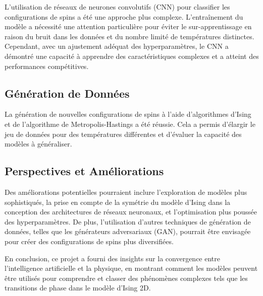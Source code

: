 \documentclass[11pt, parskip=half]{scrartcl} %
\begin{document}
L'utilisation de réseaux de neurones convolutifs (CNN) pour classifier les configurations de spins a été une approche plus complexe. L'entraînement du modèle a nécessité une attention particulière pour éviter le sur-apprentissage en raison du bruit dans les données et du nombre limité de températures distinctes. Cependant, avec un ajustement adéquat des hyperparamètres, le CNN a démontré une capacité à apprendre des caractéristiques complexes et a atteint des performances compétitives.

\subsection*{Génération de Données}

La génération de nouvelles configurations de spins à l'aide d'algorithmes d'Ising et de l'algorithme de Metropolis-Hastings a été réussie. Cela a permis d'élargir le jeu de données pour des températures différentes et d'évaluer la capacité des modèles à généraliser.

\subsection*{Perspectives et Améliorations}

Des améliorations potentielles pourraient inclure l'exploration de modèles plus sophistiqués, la prise en compte de la symétrie du modèle d'Ising dans la conception des architectures de réseaux neuronaux, et l'optimisation plus poussée des hyperparamètres. De plus, l'utilisation d'autres techniques de génération de données, telles que les générateurs adversariaux (GAN), pourrait être envisagée pour créer des configurations de spins plus diversifiées.

En conclusion, ce projet a fourni des insights sur la convergence entre l'intelligence artificielle et la physique, en montrant comment les modèles peuvent être utilisés pour comprendre et classer des phénomènes complexes tels que les transitions de phase dans le modèle d'Ising 2D.

\newpage
{}


\nocite{noauthor_ising_2023}
\nocite{diu_stat}
\nocite{Ising_auto}

\appendix
\end{document}
